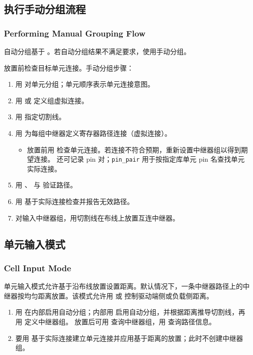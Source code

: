 \subsection{执行手动分组流程}
\subsubsection*{Performing Manual Grouping Flow}

自动分组基于 。若自动分组结果不满足要求，使用手动分组。

放置前检查目标单元连接。手动分组步骤：
\begin{enumerate}
  \item 用  对单元分组；单元顺序表示单元连接意图。
  \item 用  或  定义组虚拟连接。
  \item 用  指定切割线。
  \item 用  为每组中继器定义寄存器路径连接（虚拟连接）。
  \begin{itemize}
    \item 放置前用   检查单元连接。若连接不符合预期，重新设置中继器组以得到期望连接。 还可记录 pin 对；\texttt{pin\_pair} 用于按指定库单元 pin 名查找单元实际连接。
  \end{itemize}
  \item 用 、 与  验证路径。
  \item 用   基于实际连接检查并报告无效路径。
  \item 对输入中继器组，用切割线在布线上放置互连中继器。
\end{enumerate}

\subsection{单元输入模式}
\subsubsection*{Cell Input Mode}

单元输入模式允许基于沿布线放置设置距离。默认情况下，一条中继器路径上的中继器按均匀距离放置。该模式允许用  或  控制驱动端侧或负载侧距离。

\begin{enumerate}
  \item 用    在内部启用自动分组；内部用   启用自动分组，并根据距离推导切割线，再用    定义中继器组。
  放置后可用  查询中继器组，用  查询路径信息。
  \item 要用   基于实际连接建立单元连接并应用基于距离的放置；此时不创建中继器组。
\end{enumerate}

